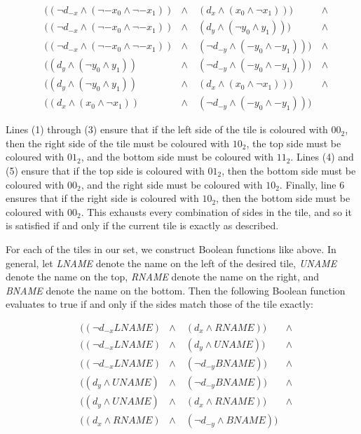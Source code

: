 \documentclass[letterpaper]{article}
\begin{document}
\begin{align}
    &((\neg d_{-x} \wedge (\neg-x_0 \wedge \neg-x_1)) &\wedge \ &(d_x \wedge (x_0 \wedge \neg x_1))) \ &\wedge\\
    &((\neg d_{-x} \wedge (\neg-x_0 \wedge \neg-x_1)) &\wedge \ &(d_y \wedge (\neg y_0 \wedge y_1))) \ &\wedge\\
    &((\neg d_{-x} \wedge (\neg-x_0 \wedge \neg-x_1)) &\wedge \ &(\neg d_{-y} \wedge (-y_0 \wedge -y_1))) \ &\wedge\\
    &((d_y \wedge (\neg y_0 \wedge y_1)) &\wedge \ &(\neg d_{-y} \wedge (-y_0 \wedge -y_1))) \ &\wedge\\
    &((d_y \wedge (\neg y_0 \wedge y_1)) &\wedge \ &(d_x \wedge (x_0 \wedge \neg x_1))) \ &\wedge\\
    &((d_x \wedge (x_0 \wedge \neg x_1)) &\wedge \ &(\neg d_{-y} \wedge (-y_0 \wedge -y_1)))
\end{align}

Lines (1) through (3) ensure that if the left side of the tile is coloured with $00_2$, then the right side of the tile must be coloured with $10_2$, the top side must be coloured with $01_2$, and the bottom side must be coloured with $11_2$.
Lines (4) and (5) ensure that if the top side is coloured with $01_2$, then the bottom side must be coloured with $00_2$, and the right side must be coloured with $10_2$.
Finally, line 6 ensures that if the right side is coloured with $10_2$, then the bottom side must be coloured with $00_2$.
This exhausts every combination of sides in the tile, and so it is satisfied if and only if the current tile is exactly as described.

For each of the tiles in our set, we construct Boolean functions like above.
In general, let \emph{LNAME} denote the name on the left of the desired tile, \emph{UNAME} denote the name on the top, \emph{RNAME} denote the name on the right, and \emph{BNAME} denote the name on the bottom. Then the following Boolean function evaluates to true if and only if the sides match those of the tile exactly:

\begin{align}
    & ((\neg d_{-x} LNAME)  &\wedge \ &(d_x \wedge RNAME)) \ &\wedge \\
    & ((\neg d_{-x} LNAME)  &\wedge \ &(d_y \wedge UNAME)) \ &\wedge\\
    & ((\neg d_{-x} LNAME)  &\wedge \ &(\neg d_{-y} BNAME)) \ &\wedge\\
    &((d_y \wedge UNAME) &\wedge \ &(\neg d_{-y} BNAME)) \ &\wedge\\
    &((d_y \wedge UNAME) &\wedge \ &(d_x \wedge RNAME)) \ &\wedge\\
    &((d_x \wedge RNAME) &\wedge \ &(\neg d_{-y} \wedge BNAME))
\end{align}
\end{document}
